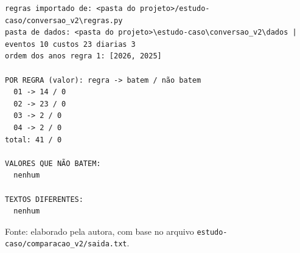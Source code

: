 \noindent\begin{minipage}{\textwidth}
\begin{lstlisting}[caption={Saída do script de comparação}, label={cod:saida-v2}, language={}, basicstyle={\fontsize{9}{11}\selectfont\ttfamily}, breaklines=true, upquote=true]
regras importado de: <pasta do projeto>/estudo-caso/conversao_v2\regras.py
pasta de dados: <pasta do projeto>\estudo-caso\conversao_v2\dados | eventos 10 custos 23 diarias 3
ordem dos anos regra 1: [2026, 2025]

POR REGRA (valor): regra -> batem / não batem
  01 -> 14 / 0
  02 -> 23 / 0
  03 -> 2 / 0
  04 -> 2 / 0
total: 41 / 0

VALORES QUE NÃO BATEM:
  nenhum

TEXTOS DIFERENTES:
  nenhum
\end{lstlisting}
\centering\footnotesize Fonte: elaborado pela autora, com base no arquivo \texttt{estudo-caso/comparacao\_v2/saida.txt}.
\end{minipage}
